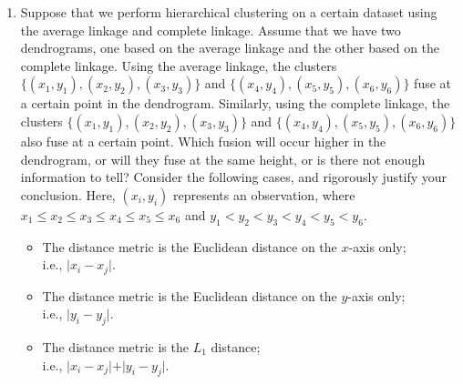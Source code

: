 \documentclass[12pt]{article}
\begin{document}
\begin{enumerate}
\item Suppose that we perform hierarchical clustering on a certain dataset using the average linkage and complete linkage. Assume that we have two dendrograms, one based on the average linkage and the other based on the complete linkage. Using the average linkage, the clusters $\{(x_1, y_1), (x_2, y_2), (x_3, y_3)\}$ and $\{(x_4, y_4), (x_5, y_5), (x_6, y_6)\}$ fuse at a certain point in the dendrogram. Similarly, using the complete linkage, the clusters $\{(x_1, y_1), (x_2, y_2), (x_3, y_3)\}$ and $\{(x_4, y_4), (x_5, y_5), (x_6, y_6)\}$ also fuse at a certain point. Which fusion will occur higher in the dendrogram, or will they fuse at the same height, or is there not enough information to tell? Consider the following cases, and rigorously justify your conclusion. Here, $(x_i, y_i)$ represents an observation, where $x_1 \leq x_2 \leq x_3 \leq x_4 \leq x_5 \leq x_6$ and $y_1 < y_2 < y_3 < y_4 < y_5 < y_6$.
\begin{itemize}
\item[(a)] The distance metric is the Euclidean distance on the $x$-axis only;\\ 
i.e., $\vert x_i - x_j \vert$.
\item[(b)] The distance metric is the Euclidean distance on the $y$-axis only;\\ 
i.e., $\vert y_i - y_j \vert$.
\item[(c)] The distance metric is the $L_1$ distance;\\ 
i.e., $\vert x_i - x_j \vert + \vert y_i - y_j \vert$.
\end{itemize}

\end{enumerate}
\end{document}
